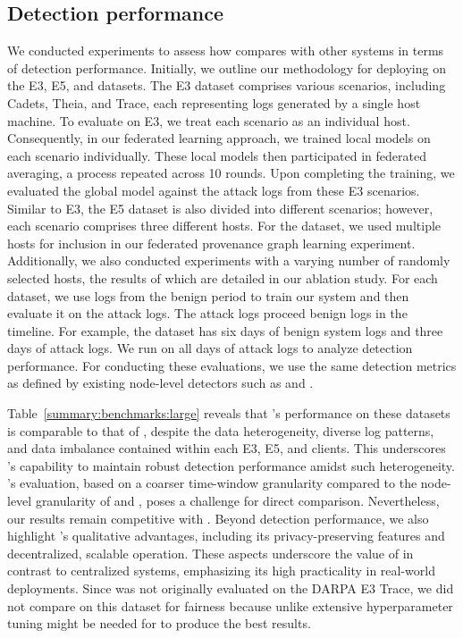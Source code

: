  \subsection{Detection performance}
 We conducted experiments to assess how \Sys compares with other systems in terms of detection performance. Initially, we outline our methodology for deploying \Sys on the \darpa E3, E5, and \optc datasets. The E3 dataset comprises various scenarios, including Cadets, Theia, and Trace, each representing logs generated by a single host machine. To evaluate \Sys on E3, we treat each scenario as an individual host. Consequently, in our federated learning approach, we trained local \gnnshort models on each scenario individually. These local models then participated in federated averaging, a process repeated across 10 rounds. Upon completing the training, we evaluated the global \gnnshort model against the attack logs from these E3 scenarios. Similar to E3, the E5 dataset is also divided into different scenarios; however, each scenario comprises three different hosts. For the \optc dataset, we used multiple hosts for inclusion in our federated provenance graph learning experiment. Additionally, we also conducted experiments with a varying number of randomly selected hosts, the results of which are detailed in our ablation study. For each dataset, we use logs from the benign period to train our system and then evaluate it on the attack logs. The attack logs proceed benign logs in the timeline. For example, the \optc dataset has six days of benign system logs and three days of attack logs. We run \Sys on all days of attack logs to analyze detection performance. For conducting these evaluations, we use the same detection metrics as defined by existing node-level detectors such as \threatrace and \flash.

 Table~\ref{summary:benchmarks:large} reveals that \Sys's performance on these datasets is comparable to that of \flash, despite the data heterogeneity, diverse log patterns, and data imbalance contained within each E3, E5, and \optc clients. This underscores \Sys's capability to maintain robust detection performance amidst such heterogeneity. \kairos's evaluation, based on a coarser time-window granularity compared to the node-level granularity of \flash and \Sys, poses a challenge for direct comparison. Nevertheless, our results remain competitive with \kairos. Beyond detection performance, we also highlight \Sys's qualitative advantages, including its privacy-preserving features and decentralized, scalable operation. These aspects underscore the value of \Sys in contrast to centralized systems, emphasizing its high practicality in real-world deployments. Since \kairos was not originally evaluated on the DARPA E3 Trace, we did not compare \kairos on this dataset for fairness because unlike \flash extensive hyperparameter tuning might be needed for \kairos to produce the best results.

